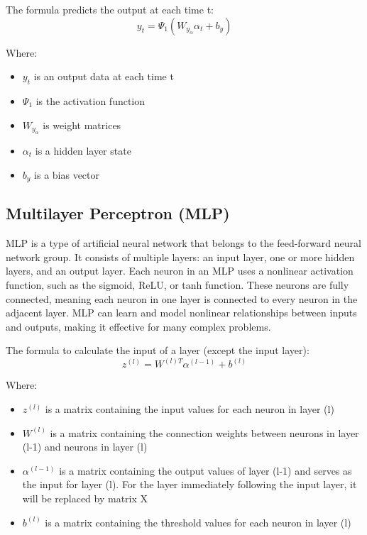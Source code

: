 \documentclass{ieeeojies}
\begin{document}
The formula predicts the output at each time t:\\
\[ y_t = \Psi_1(W_y_\alpha\alpha_t + b_y) \]

Where:\\
    \begin{itemize}
        \item $y_t$ is an output data at each time t
        \item $\Psi_1$ is the activation function
        \item $W_y_\alpha$ is weight matrices
        \item $\alpha_t$ is a hidden layer state
        \item $b_y$ is a bias vector
    \end{itemize}
\subsection{Multilayer Perceptron (MLP)}
MLP is a type of artificial neural network that belongs to the feed-forward neural network group. It consists of multiple layers: an input layer, one or more hidden layers, and an output layer. Each neuron in an MLP uses a nonlinear activation function, such as the sigmoid, ReLU, or tanh function. These neurons are fully connected, meaning each neuron in one layer is connected to every neuron in the adjacent layer. MLP can learn and model nonlinear relationships between inputs and outputs, making it effective for many complex problems.

The formula to calculate the input of a layer (except the input layer):\\

\[ z^{(l)} = W^{(l) T}\alpha^{(l-1)} + b^{(l)} \]

Where:\\
    \begin{itemize}
        \item $z^{(l)}$ is a matrix containing the input values for each neuron in layer (l)
        \item $W^{(l)}$ is a matrix containing the connection weights between neurons in layer (l-1) and neurons in layer (l)
        \item $\alpha^{(l-1)}$ is a matrix containing the output values of layer (l-1) and serves as the input for layer (l). For the layer immediately following the input layer, it will be replaced by matrix X
        \item $b^{(l)}$ is a matrix containing the threshold values for each neuron in layer (l)
    \end{itemize}\\
        
\end{document}
